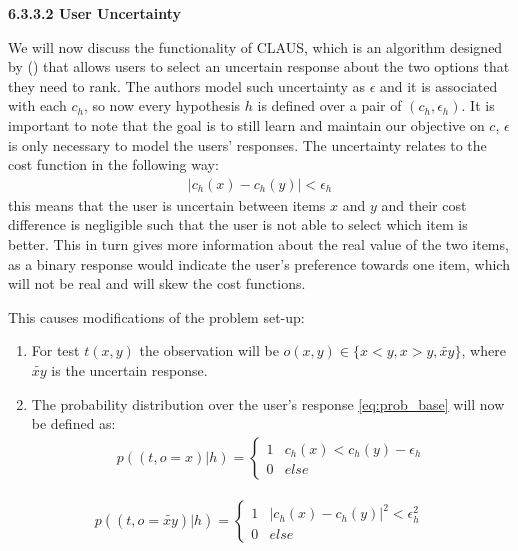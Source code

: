 \documentclass[
  letterpaper,
  numbers=noenddot,
  DIV=11,
  oneside]{scrreprt}
\theoremstyle{remark}
\begin{document}
\textbf{6.3.3.2 User Uncertainty}

We will now discuss the functionality of CLAUS, which is an algorithm
designed by () that allows
users to select an uncertain response about the two options that they
need to rank. The authors model such uncertainty as \(\epsilon\) and it
is associated with each \(c_h\), so now every hypothesis \(h\) is
defined over a pair of \((c_h, \epsilon_h)\). It is important to note
that the goal is to still learn and maintain our objective on \(c\),
\(\epsilon\) is only necessary to model the users' responses. The
uncertainty relates to the cost function in the following way:
\[\begin{aligned}
    |c_h(x) - c_h(y)| < \epsilon_h
\end{aligned}\] this means that the user is uncertain between items
\(x\) and \(y\) and their cost difference is negligible such that the
user is not able to select which item is better. This in turn gives more
information about the real value of the two items, as a binary response
would indicate the user's preference towards one item, which will not be
real and will skew the cost functions.

This causes modifications of the problem set-up:

\begin{enumerate}
\def\labelenumi{\arabic{enumi}.}
\item
  For test \(t(x,y)\) the observation will be
  \(o(x,y) \in \{x<y, x>y, \tilde{xy}\}\), where \(\tilde{xy}\) is the
  uncertain response.
\item
  The probability distribution over the user's response
  \hyperref[eq:prob_base]{{[}eq:prob\_base{]}} will now be defined as:
  \[\begin{aligned}
  p((t, o = x) | h) = 
  \begin{cases}
      1 & c_h(x) < c_h(y) - \epsilon_h\\
      0 & else
  \end{cases}
  \end{aligned}\]
\end{enumerate}

\[\begin{aligned}
    p((t, o = \tilde{xy}) | h) = 
    \begin{cases}
        1 & |c_h(x) - c_h(y)|^2 < \epsilon_h^2\\
        0 & else
    \end{cases}
\end{aligned}\]
\end{document}
